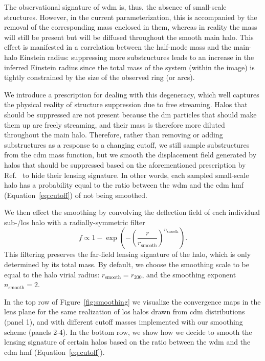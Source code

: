 The observational signature of \gls*{wdm} is, thus, the absence of small-scale structures. However, in the current parameterization, this is accompanied by the removal of the corresponding mass enclosed in them, whereas in reality the mass will still be present but will be diffused throughout the smooth main halo. This effect is manifested in a correlation between the half-mode mass and the main-halo Einstein radius: suppressing more substructures leads to an increase in the inferred Einstein radius since the total mass of the system (within the image) is tightly constrained by the size of the observed ring (or arcs).

We introduce a prescription for dealing with this degeneracy, which well captures the physical reality of structure suppression due to free streaming. 
Halos that should be suppressed are not present because the \gls*{dm} particles that should make them up are freely streaming, and their mass is therefore more diluted throughout the main halo.
Therefore, rather than removing or adding substructures as a response to a changing cutoff, we still sample substructures from the \gls*{cdm} mass function, but we smooth the displacement field generated by halos that should be suppressed based on the aforementioned prescription by Ref.~\cite{Lovell:2020bcy} to hide their lensing signature. In other words, each sampled small-scale halo has a probability equal to the ratio between the \gls*{wdm} and the \gls*{cdm} \gls*{hmf} (Equation~\eqref{eq:cutoff}) of not being smoothed. 

We then effect the smoothing by convolving the deflection field of each individual sub-/\gls*{los} halo with a radially-symmetric filter
\begin{equation}
f \propto 1 - \exp\left(-\left(\frac{r}{r_{\mathrm{smooth}}}\right)^{n_{\mathrm{smooth}}}\right).
\end{equation}
This filtering preserves the far-field lensing signature of the halo, which is only determined by its total mass.
By default, we choose the smoothing scale to be equal to the halo virial radius: $r_\mathrm{smooth}=r_{200}$, and the smoothing exponent $n_\mathrm{smooth}=2$.

In the top row of Figure~\ref{fig:smoothing} we visualize the convergence maps in the lens plane for the same realization of \gls*{los} halos drawn from \gls*{cdm} distributions (panel 1), and with different cutoff masses implemented with our smoothing scheme (panels 2-4). In the bottom row, we show how we decide to smooth the lensing signature of certain halos based on the ratio between the \gls*{wdm} and the \gls*{cdm} \gls*{hmf} (Equation~\eqref{eq:cutoff}). 


